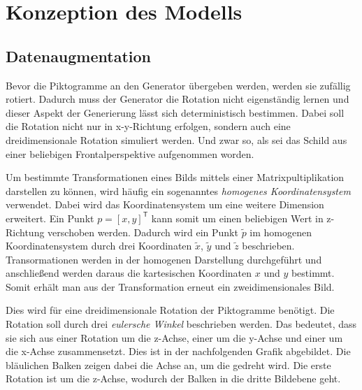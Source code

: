 \chapter{Konzeption des Modells}
\label{chap:konzept}







\section{Datenaugmentation}
\label{chap:3-datenaugmentation}
Bevor die Piktogramme an den Generator übergeben werden, werden sie zufällig rotiert. Dadurch muss der Generator die Rotation nicht eigenständig lernen und dieser Aspekt der Generierung lässt sich deterministisch bestimmen. Dabei soll die Rotation nicht nur in x-y-Richtung erfolgen, sondern auch eine dreidimensionale Rotation simuliert werden. Und zwar so, als sei das Schild aus einer beliebigen Frontalperspektive aufgenommen worden.

Um bestimmte Transformationen eines Bilds mittels einer Matrixpultiplikation darstellen zu können, wird häufig ein sogenanntes \emph{homogenes Koordinatensystem} verwendet. Dabei wird das Koordinatensystem um eine weitere Dimension erweitert. Ein Punkt $p = [x, y]^\mathsf{T}$ kann somit um einen beliebigen Wert in z-Richtung verschoben werden. Dadurch wird ein Punkt $\tilde{p}$ im homogenen Koordinatensystem durch drei Koordinaten $\tilde{x}$, $\tilde{y}$ und $\tilde{z}$ beschrieben. Transormationen werden in der homogenen Darstellung durchgeführt und anschließend werden daraus die kartesischen Koordinaten $x$ und $y$ bestimmt. Somit erhält man aus der Transformation erneut ein zweidimensionales Bild. \cite{geometric-ops} \cite{math-primer}

Dies wird für eine dreidimensionale Rotation der Piktogramme benötigt. Die Rotation soll durch drei \emph{eulersche Winkel} beschrieben werden. Das bedeutet, dass sie sich aus einer Rotation um die z-Achse, einer um die y-Achse und einer um die x-Achse zusammensetzt. Dies ist in der nachfolgenden Grafik abgebildet. Die bläulichen Balken zeigen dabei die Achse an, um die gedreht wird. Die erste Rotation ist um die z-Achse, wodurch der Balken in die dritte Bildebene geht. \cite{math-primer}

